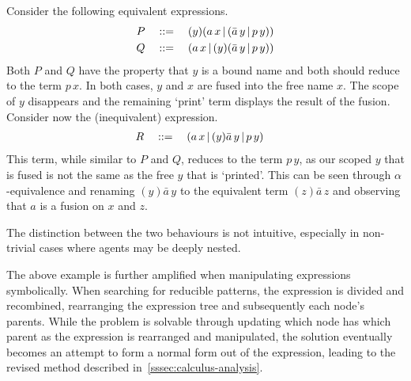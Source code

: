         \begin{example*}
            Consider the following equivalent expressions.
            \begin{align*}
                P \quad & ::= \quad (y)(a \, x \,|\, (\bar{a} \, y \,|\, p \, y)) \\
                Q \quad & ::= \quad (a \, x \,|\, (y)(\bar{a} \, y \,|\, p \, y))
            \end{align*}
            Both $P$ and $Q$ have the property that $y$ is a bound name and both should reduce to the term $p \, x$.
            In both cases, $y$ and $x$ are fused into the free name $x$. The scope of $y$ disappears and the remaining `print' term displays the result of the fusion.
            Consider now the (inequivalent) expression.
            \begin{align*}
                R \quad & ::= \quad (a \, x \, | \, (y)\bar{a} \, y \, | \, p \, y)
            \end{align*}
            This term, while similar to $P$ and $Q$, reduces to the term $p \, y$, as our scoped $y$ that is fused is not the same as the free $y$ that is `printed'.
            This can be seen through $\alpha$-equivalence and renaming $(y)\bar{a} \, y$ to the equivalent term $(z)\bar{a} \, z$ and observing that $a$ is a fusion on $x$ and $z$.

            The distinction between the two behaviours is not intuitive, especially in non-trivial cases where agents may be deeply nested.
        \end{example*}

        The above example is further amplified when manipulating expressions symbolically.
        When searching for reducible patterns, the expression is divided and recombined, rearranging the expression tree and subsequently each node's parents.
        While the problem is solvable through updating which node has which parent as the expression is rearranged and manipulated, the solution eventually becomes an attempt to form a normal form out of the expression, leading to the revised method described in~\ref{sssec:calculus-analysis}.
